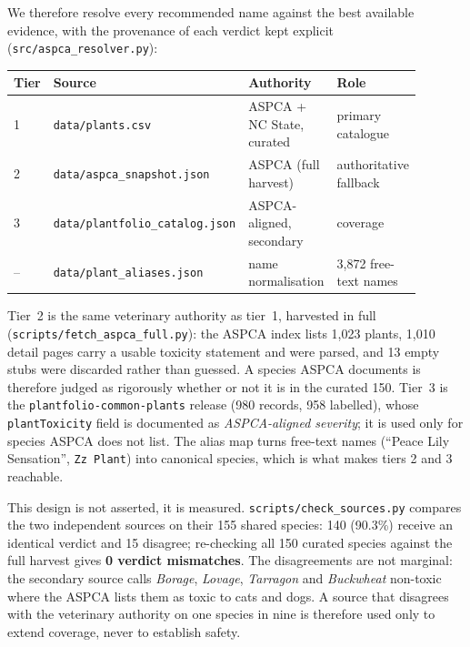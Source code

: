 \documentclass[12pt,a4paper]{article}
\begin{document}
We therefore resolve every recommended name against the best available
evidence, with the provenance of each verdict kept explicit
(\texttt{src/aspca\_resolver.py}):

\begin{center}
\small
\begin{tabular}{p{0.05\linewidth} p{0.29\linewidth} p{0.29\linewidth} p{0.26\linewidth}}
\toprule
Tier & Source & Authority & Role \\
\midrule
1 & \texttt{data/plants.csv} & ASPCA + NC State, curated & primary catalogue \\
2 & \texttt{data/aspca\_snapshot.json} & ASPCA (full harvest) & authoritative fallback \\
3 & \texttt{data/plantfolio\_catalog.json} & ASPCA-aligned, secondary & coverage \\
-- & \texttt{data/plant\_aliases.json} & name normalisation & 3{,}872 free-text names \\
\bottomrule
\end{tabular}
\end{center}

Tier~2 is the same veterinary authority as tier~1, harvested in full
(\texttt{scripts/fetch\_aspca\_full.py}): the ASPCA index lists 1{,}023
plants, 1{,}010 detail pages carry a usable toxicity statement and were
parsed, and 13 empty stubs were discarded rather than guessed. A species
ASPCA documents is therefore judged as rigorously whether or not it is in the
curated 150. Tier~3 is the \texttt{plantfolio-common-plants} release (980
records, 958 labelled), whose \texttt{plantToxicity} field is documented as
\emph{ASPCA-aligned severity}; it is used only for species ASPCA does not
list. The alias map turns free-text names (``Peace Lily Sensation'',
\texttt{Zz Plant}) into canonical species, which is what makes tiers 2 and 3
reachable.

This design is not asserted, it is measured. \texttt{scripts/check\_sources.py}
compares the two independent sources on their 155 shared species: 140
(90.3\%) receive an identical verdict and 15 disagree; re-checking all 150
curated species against the full harvest gives \textbf{0 verdict mismatches}.
The disagreements are not marginal: the secondary source calls \emph{Borage},
\emph{Lovage}, \emph{Tarragon} and \emph{Buckwheat} non-toxic where the
ASPCA lists them as toxic to cats and dogs. A source that disagrees with the
veterinary authority on one species in nine is therefore used only to extend
coverage, never to establish safety.
\end{document}
